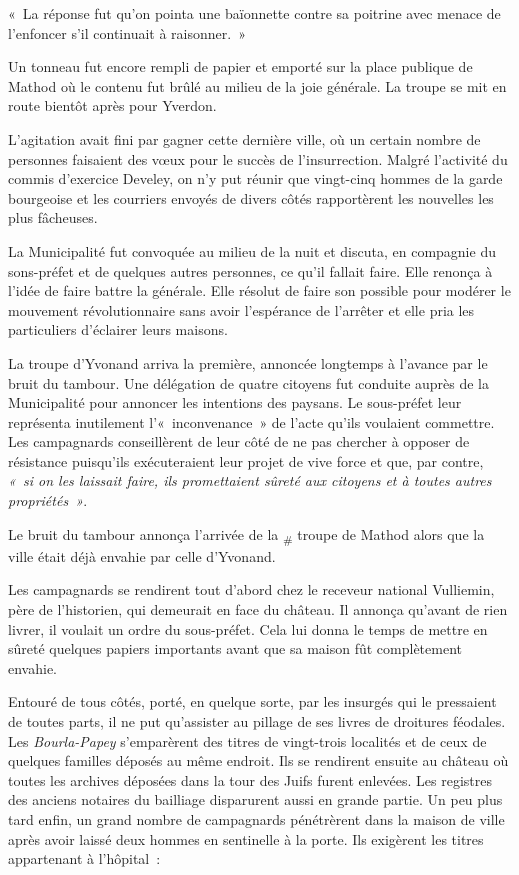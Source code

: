 \documentclass[french,twoside]{book} %
\newenvironment{quoteblock}%
  {\begin{quoting}}
  {\end{quoting}}
\newenvironment{quotebar}{%
    \def\FrameCommand{{\color{rubric!10!}\vrule width 0.5em} \hspace{0.9em}}%
    \def\OuterFrameSep{\itemsep} %
    \MakeFramed {\advance\hsize-\width \FrameRestore}
  }%
  {%
    \endMakeFramed
  }
\renewenvironment{quoteblock}%
  {%
    \savenotes
    \setstretch{0.9}
    \normalfont
    \begin{quotebar}
  }
  {%
    \end{quotebar}
    \spewnotes
  }
\begin{document}
\begin{quoteblock}
\noindent « La réponse fut qu’on pointa une baïonnette contre sa poitrine avec menace de l’enfoncer s’il continuait à raisonner. »\end{quoteblock}

\noindent Un tonneau fut encore rempli de papier et emporté sur la place publique de Mathod où le contenu fut brûlé au milieu de la joie générale. La troupe se mit en route bientôt après pour Yverdon.\par
L’agitation avait fini par gagner cette dernière ville, où un certain nombre de personnes faisaient des vœux pour le succès de l’insurrection. Malgré l’activité du commis d’exercice Develey, on n’y put réunir que vingt-cinq hommes de la garde bourgeoise et les courriers envoyés de divers côtés rapportèrent les nouvelles les plus fâcheuses.\par
La Municipalité fut convoquée au milieu de la nuit et discuta, en compagnie du sons-préfet et de quelques autres personnes, ce qu’il fallait faire. Elle renonça à l’idée de faire battre la générale. Elle résolut de faire son possible pour modérer le mouvement révolutionnaire sans avoir l’espérance de l’arrêter et elle pria les particuliers d’éclairer leurs maisons.\par
La troupe d’Yvonand arriva la première, annoncée longtemps à l’avance par le bruit du tambour. Une délégation de quatre citoyens fut conduite auprès de la Municipalité pour annoncer les intentions des paysans. Le sous-préfet leur représenta inutilement l’« inconvenance » de l’acte qu’ils voulaient commettre. Les campagnards conseillèrent de leur côté de ne pas chercher à opposer de résistance puisqu’ils exécuteraient leur projet de vive force et que, par contre, \emph{« si on les laissait faire, ils promettaient sûreté aux citoyens et à toutes autres propriétés »}.\par
Le bruit du tambour annonça l’arrivée de la \textsubscript{\#} troupe de Mathod alors que la ville était déjà envahie par celle d’Yvonand.\par
Les campagnards se rendirent tout d’abord chez le receveur national Vulliemin, père de l’historien, qui demeurait en face du château. Il annonça qu’avant de rien livrer, il voulait un ordre du sous-préfet. Cela lui donna le temps de mettre en sûreté quelques papiers importants avant que sa maison fût complètement envahie.\par
Entouré de tous côtés, porté, en quelque sorte, par les insurgés qui le pressaient de toutes parts, il ne put qu’assister au pillage de ses livres de droitures féodales. Les \emph{Bourla-Papey} s’emparèrent des titres de vingt-trois localités et de ceux de quelques familles déposés au même endroit. Ils se rendirent ensuite au château où toutes les archives déposées dans la tour des Juifs furent enlevées. Les registres des anciens notaires du bailliage disparurent aussi en grande partie. Un peu plus tard enfin, un grand nombre de campagnards pénétrèrent dans la maison de ville après avoir laissé deux hommes en sentinelle à la porte. Ils exigèrent les titres appartenant à l’hôpital :\par
\end{document}
